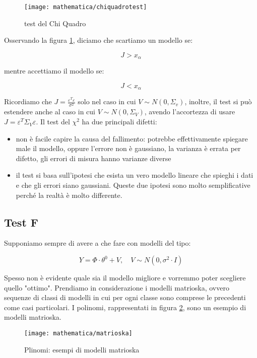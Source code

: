 \begin{figure}[htbp]
  \centering
  \texttt{[image: mathematica/chiquadrotest]}
  \caption{test del Chi Quadro \label{fig:chiquadrotest}}
\end{figure}

Osservando la figura \ref{fig:chiquadrotest}, diciamo che scartiamo un modello se:

    \[ J>x_\alpha \]

mentre accettiamo il modello se:

    \[ J<x_\alpha \]

Ricordiamo che $J=\frac{\varepsilon^T\varepsilon}{\sigma^2}$ solo nel caso in cui $V\sim N(0,\Sigma_v)$, inoltre, il test si può estendere anche al caso in cui $V\sim N(0,\Sigma_V)$, avendo l'accortezza di usare $J=\varepsilon^T\Sigma_V\varepsilon$. \newline
Il test del $\chi^2$ ha due principali difetti:
\begin{itemize}
  \item non è facile capire la causa del fallimento: potrebbe effettivamente spiegare male il modello, oppure l'errore non è gaussiano, la varianza è errata per difetto, gli errori di misura hanno varianze diverse
  \item il test si basa sull'ipotesi che esista un vero modello lineare che spieghi i dati e che gli errori siano gaussiani. Queste due ipotesi sono molto semplificative perché la realtà è molto differente.
\end{itemize}
\subsection{Test F}
Supponiamo sempre di avere a che fare con modelli del tipo:

    \[ Y=\Phi\cdot\theta^0+V,  \quad  V\sim N(0,\sigma^2\cdot I) \]

Spesso non è evidente quale sia il modello migliore e vorremmo poter scegliere quello "ottimo". Prendiamo in considerazione i modelli matrioska, ovvero sequenze di classi di modelli in cui per ogni classe sono comprese le precedenti come casi particolari. I polinomi, rappresentati in figura \ref{fig:matrioska}, sono un esempio di modelli matrioska.

\begin{figure}[htbp]
  \centering
  \texttt{[image: mathematica/matrioska]}
  \caption{Plinomi: esempi di modelli matrioska\label{fig:matrioska}}
\end{figure}

